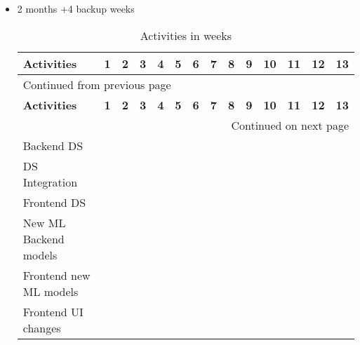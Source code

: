 \documentclass[a4paper]{article}
\begin{document}
\begin{itemize}
\item 2 months +4 backup weeks

\sffamily
\begin{longtable}{llllllllllllll}
\caption{Activities in weeks}
\\[0pt]
\cellcolor{gray!16} \textbf{Activities} & \cellcolor{gray!16} \textbf{1} & \cellcolor{gray!16} \textbf{2} & \cellcolor{gray!16} \textbf{3} & \cellcolor{gray!16} \textbf{4} & \cellcolor{gray!16} \textbf{5} & \cellcolor{gray!16} \textbf{6} & \cellcolor{gray!16} \textbf{7} & \cellcolor{gray!16} \textbf{8} & \cellcolor{gray!16} \textbf{9} & \cellcolor{gray!16} \textbf{10} & \cellcolor{gray!16} \textbf{11} & \cellcolor{gray!16} \textbf{12} & \cellcolor{gray!16} \textbf{13}\\[0pt]
\hline
\endfirsthead
\multicolumn{14}{l}{Continued from previous page} \\[0pt]
\hline

\cellcolor{gray!16} \textbf{Activities} & \cellcolor{gray!16} \textbf{1} & \cellcolor{gray!16} \textbf{2} & \cellcolor{gray!16} \textbf{3} & \cellcolor{gray!16} \textbf{4} & \cellcolor{gray!16} \textbf{5} & \cellcolor{gray!16} \textbf{6} & \cellcolor{gray!16} \textbf{7} & \cellcolor{gray!16} \textbf{8} & \cellcolor{gray!16} \textbf{9} & \cellcolor{gray!16} \textbf{10} & \cellcolor{gray!16} \textbf{11} & \cellcolor{gray!16} \textbf{12} & \cellcolor{gray!16} \textbf{13} \\[0pt]

\hline
\endhead
\hline\multicolumn{14}{r}{Continued on next page} \\
\endfoot
\endlastfoot
\hline
\cellcolor{gray!16}Backend DS & \cellcolor{blue!16} & \cellcolor{blue!16} &  &  &  &  &  &  &  &  &  &  & \\[0pt]
\cellcolor{gray!16}DS Integration &  & \cellcolor{blue!32} & \cellcolor{blue!32} & \cellcolor{blue!32} & \cellcolor{blue!32} & \cellcolor{blue!32} &  &  &  &  &  &  & \\[0pt]
\cellcolor{gray!16}Frontend DS &  &  &  & \cellcolor{blue!16} & \cellcolor{blue!16} & \cellcolor{blue!16} & \cellcolor{blue!16} &  &  &  &  &  & \\[0pt]
\cellcolor{gray!16}New ML Backend models &  &  & \cellcolor{blue!32} & \cellcolor{blue!32} & \cellcolor{blue!32} &  &  &  &  &  &  &  & \\[0pt]
\cellcolor{gray!16}Frontend new ML models &  &  &  &  &  & \cellcolor{blue!16} & \cellcolor{blue!16} & \cellcolor{blue!16} &  &  &  &  & \\[0pt]
\cellcolor{gray!16}Frontend UI changes &  &  &  &  &  &  & \cellcolor{blue!32} & \cellcolor{blue!32} & \cellcolor{blue!32} & \cellcolor{blue!32} & \cellcolor{blue!32} & \cellcolor{blue!32} & \cellcolor{blue!32}\\[0pt]
\end{longtable}
\rmfamily
\end{itemize}
\end{document}
